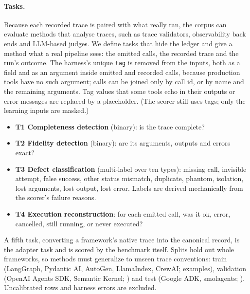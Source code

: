 \documentclass[10pt]{article}
\begin{document}
\paragraph{Tasks.} Because each recorded trace is paired with what really ran, the corpus can evaluate methods that analyse traces, such as trace validators, observability back ends and LLM-based judges. We define tasks that hide the ledger and give a method what a real pipeline sees: the emitted calls, the recorded trace and the run's outcome. The harness's unique \texttt{tag} is removed from the inputs, both as a field and as an argument inside emitted and recorded calls, because production tools have no such argument; calls can be joined only by call id, or by name and the remaining arguments. Tag values that some tools echo in their outputs or error messages are replaced by a placeholder. (The scorer still uses tags; only the learning inputs are masked.)
\begin{itemize}
\item \textbf{T1 Completeness detection} (binary): is the trace complete?
\item \textbf{T2 Fidelity detection} (binary): are its arguments, outputs and errors exact?
\item \textbf{T3 Defect classification} (multi-label over ten types): missing call, invisible attempt, false success, other status mismatch, duplicate, phantom, isolation, lost arguments, lost output, lost error. Labels are derived mechanically from the scorer's failure reasons.
\item \textbf{T4 Execution reconstruction}: for each emitted call, was it \textsf{ok}, \textsf{error}, \textsf{cancelled}, still \textsf{running}, or never executed?
\end{itemize}
A fifth task, converting a framework's native trace into the canonical record, is the adapter task and is scored by the benchmark itself. Splits hold out whole frameworks, so methods must generalize to unseen trace conventions: train (LangGraph, Pydantic AI, AutoGen, LlamaIndex, CrewAI; \taskTrainN{} examples), validation (OpenAI Agents SDK, Semantic Kernel; \taskValN) and test (Google ADK, smolagents; \taskTestN). Uncalibrated rows and harness errors are excluded.
\end{document}
